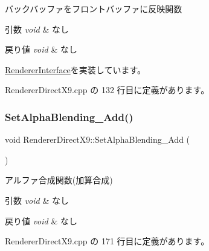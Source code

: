 バックバッファをフロントバッファに反映関数 


\begin{DoxyParams}{引数}
{\em void} & なし \\
\hline
\end{DoxyParams}

\begin{DoxyRetVals}{戻り値}
{\em void} & なし \\
\hline
\end{DoxyRetVals}


\mbox{\hyperlink{class_renderer_interface_aa9e12d2a2f5ffa351c457cfc7806b6f1}{Renderer\+Interface}}を実装しています。



 Renderer\+Direct\+X9.\+cpp の 132 行目に定義があります。

\mbox{\label{class_renderer_direct_x9_aa552107a3d5f8a61347fe10741fd04a3}} 
\subsubsection{\texorpdfstring{Set\+Alpha\+Blending\+\_\+\+Add()}{SetAlphaBlending\_Add()}}
{\footnotesize\ttfamily void Renderer\+Direct\+X9\+::\+Set\+Alpha\+Blending\+\_\+\+Add (\begin{DoxyParamCaption}{ }\end{DoxyParamCaption})}



アルファ合成関数(加算合成) 


\begin{DoxyParams}{引数}
{\em void} & なし \\
\hline
\end{DoxyParams}

\begin{DoxyRetVals}{戻り値}
{\em void} & なし \\
\hline
\end{DoxyRetVals}


 Renderer\+Direct\+X9.\+cpp の 171 行目に定義があります。

\mbox{\label{class_renderer_direct_x9_a083f55d941075227189769fd9807ffd1}} 
